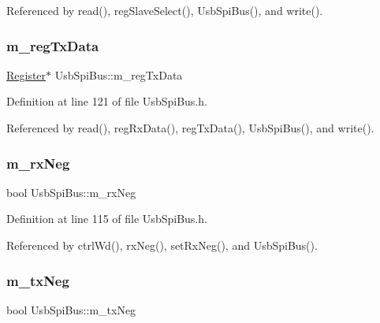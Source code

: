 Referenced by read(), reg\+Slave\+Select(), Usb\+Spi\+Bus(), and write().

\mbox{\label{classUsbSpiBus_ae4b9ec4d035b9a507735b28dba04556c}} 
\subsubsection{\texorpdfstring{m\+\_\+reg\+Tx\+Data}{m\_regTxData}}
{\footnotesize\ttfamily \hyperlink{classRegister}{Register}$\ast$ Usb\+Spi\+Bus\+::m\+\_\+reg\+Tx\+Data\hspace{0.3cm}{\ttfamily [private]}}



Definition at line 121 of file Usb\+Spi\+Bus.\+h.



Referenced by read(), reg\+Rx\+Data(), reg\+Tx\+Data(), Usb\+Spi\+Bus(), and write().

\mbox{\label{classUsbSpiBus_abf36f2df24c3ec5363efe73c9771bbc8}} 
\subsubsection{\texorpdfstring{m\+\_\+rx\+Neg}{m\_rxNeg}}
{\footnotesize\ttfamily bool Usb\+Spi\+Bus\+::m\+\_\+rx\+Neg\hspace{0.3cm}{\ttfamily [private]}}



Definition at line 115 of file Usb\+Spi\+Bus.\+h.



Referenced by ctrl\+Wd(), rx\+Neg(), set\+Rx\+Neg(), and Usb\+Spi\+Bus().

\mbox{\label{classUsbSpiBus_a48528e7dcb036ecc1732581a89e16d10}} 
\subsubsection{\texorpdfstring{m\+\_\+tx\+Neg}{m\_txNeg}}
{\footnotesize\ttfamily bool Usb\+Spi\+Bus\+::m\+\_\+tx\+Neg\hspace{0.3cm}{\ttfamily [private]}}



